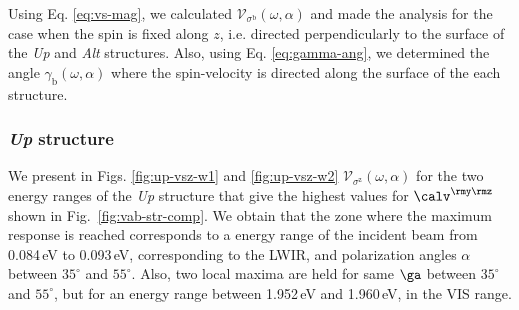 \documentclass[prb,11pt,tightenlines,twocolumn,aps]{revtex4-1}
\begin{document}

Using Eq. \eqref{eq:vs-mag}, we calculated $\mathcal{V}_{\sigma^{\mathrm{b}}}
(\omega,\alpha)$ and made the analysis for the case when the spin is fixed
along $z$, i.e. directed perpendicularly to the surface of the \emph{Up} and
\emph{Alt} structures. Also, using Eq. \eqref{eq:gamma-ang}, we determined the
angle $\gamma_{\mathrm{b}}(\omega,\alpha)$ where the spin-velocity is directed
along the surface of the each structure.
% 

\subsubsection{\emph{Up} structure}\label{up:fs}

We present in Figs. \ref{fig:up-vsz-w1} and \ref{fig:up-vsz-w2}
$\mathcal{V}_{\sigma^{\mathrm{z}}} (\omega,\alpha)$ for the two energy ranges
of the \emph{Up} structure that give the highest values for $\calv^{\rmy\rmz}$
shown in Fig.~\ref{fig:vab-str-comp}.
% 
We obtain that the zone where the maximum response is reached corresponds to a
energy range of the incident beam from 0.084\,eV to 0.093\,eV, corresponding to
the LWIR, and polarization angles $\alpha$ between $35^{\circ}$ and
$55^{\circ}$. Also,  two local maxima are held for same $\ga$ between
$35^{\circ}$ and $55^{\circ}$, but for an energy range between 1.952\,eV and
1.960\,eV, in the VIS range.
\end{document}
